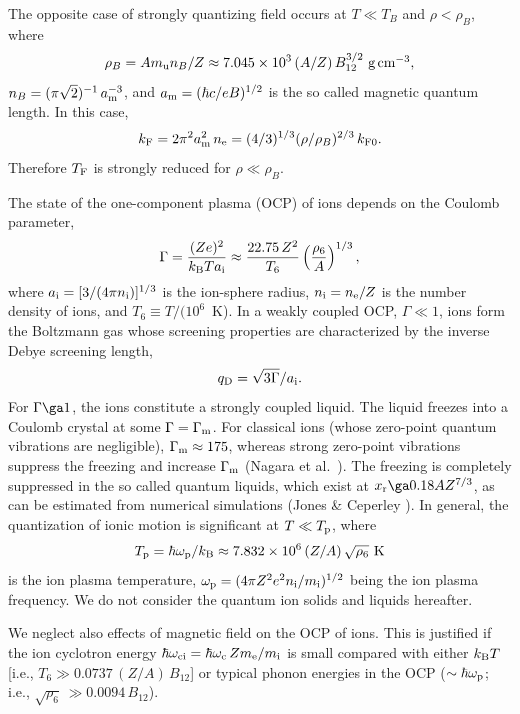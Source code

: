 \documentclass{aa}
\newcommand{\gcc}{\mbox{~g\,cm$^{-3}$}}
\newcommand{\beq}{\begin{equation}}
\newcommand{\eeq}{\end{equation}}
\newcommand{\kB}{k_{\rm B}}
\newcommand{\omc}{\omega_{\rm c}}
\newcommand{\mel}{m_{\rm e}}
\newcommand{\xr}{x_{\rm r}}
\newcommand{\am}{a_{\rm m}}
\begin{document}
The opposite case of strongly quantizing field
occurs at $T\ll T_B$ and $\rho<\rho_B$,
where
\beq
    \rho_B = A m_{\rm u} n_B / Z
          \approx 7.045 \times10^3 \,(A/Z)\,B_{12}^{3/2}\gcc,
\eeq
$n_B=(\pi\sqrt2)^{-1} \, \am^{-3}$,
and $\am = (\hbar c/eB)^{1/2}$
is the so called magnetic quantum length.
In this case,
\beq
    k_{\rm F} = { 2\pi^2 \am^2}\,n_{\rm e}
  = (4/3)^{1/3} ({\rho/\rho_B})^{2/3}
      \,k_{\rm F0}.
\eeq
Therefore $T_{\rm F}$ is strongly reduced
for $\rho \ll \rho_B$.

The state of the one-component plasma (OCP) of
ions depends on the Coulomb parameter,
%
\beq
  \Gamma = {(Ze)^2\over \kB  T a_{\rm i}}
  \approx {22.75\, Z^2 \over T_6}\left({\rho_6\over A}\right)^{1/3},
\label{Gamma}
\eeq
%
where
$a_{\rm i}=[3/(4\pi n_{\rm i})]^{1/3}$ is the ion-sphere radius,
$n_{\rm i}=n_{\rm e}/Z$ is the number density of ions,
and $T_6\equiv T/(10^6$~K).
In a weakly coupled OCP, $\Gamma \ll 1$, ions form the Boltzmann gas
whose screening properties are characterized by
the inverse Debye screening length,
\beq
   q_{\rm D} = \sqrt{3\Gamma}/a_{\rm i}.
\eeq
For $\Gamma \ga 1$, the ions constitute
a strongly coupled liquid.
The liquid freezes into a Coulomb crystal
at some $\Gamma = \Gamma_{\rm m}$.
For classical ions (whose zero-point quantum vibrations are negligible),
$\Gamma_{\rm m}\approx175$, whereas
strong zero-point vibrations suppress the freezing and increase
$\Gamma_{\rm m}$ (Nagara et al.\ \cite{nnn87}).
The freezing is completely suppressed in the so called quantum liquids,
which exist at $\xr\ga 0.18 A Z^{7/3}$,
as can be estimated from numerical simulations (Jones \& Ceperley \cite{jc96}).
In general, the quantization of ionic motion is significant
at $T\ll T_{\rm p}$, where
%
\beq
      T_{\rm p}  =  \hbar \omega_{\rm p} / \kB
          \approx 7.832 \times 10^6 \, (Z/A)\,\sqrt{\rho_6}{\rm~K}
\label{T_p}
\eeq
%
is the ion plasma temperature,
$\omega_{\rm p}  = ( 4 \pi Z^2 e^2 n_{\rm i} / m_{\rm i} )^{1/2}$
being the ion plasma frequency. We do not consider 
the quantum ion solids and liquids hereafter.

We neglect also effects of magnetic field on
the OCP of ions. This is justified if
the ion cyclotron energy $\hbar\omega_{\rm ci}
=\hbar\omc \, Z\mel/m_{\rm i}$ is small compared with
either $\kB T$ [i.e., $T_6 \gg 0.0737 \,(Z/A)\, B_{12}$]
or typical phonon energies in the OCP
($\sim \hbar \omega_{\rm p}$; i.e., $\sqrt{\rho_6}\,\gg 0.0094 \,B_{12}$).
\end{document}
